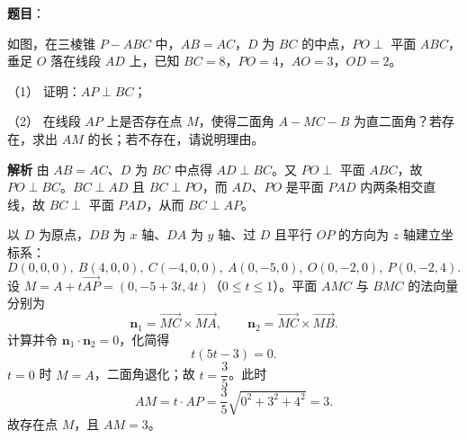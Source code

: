 \begin{answer}

\textbf{题目}：

如图，在三棱锥 $P-ABC$ 中，$AB=AC$，$D$ 为 $BC$ 的中点，$PO\perp$ 平面 $ABC$，垂足 $O$ 落在线段 $AD$ 上，已知 $BC=8$，$PO=4$，$AO=3$，$OD=2$。

（1） 证明：$AP\perp BC$；

（2） 在线段 $AP$ 上是否存在点 $M$，使得二面角 $A-MC-B$ 为直二面角？若存在，求出 $AM$ 的长；若不存在，请说明理由。
\nopagebreak[4]
\begin{center}\end{center}
\nopagebreak[4]
\textbf{解析}
由 $AB=AC$、$D$ 为 $BC$ 中点得 $AD\perp BC$。又 $PO\perp$ 平面 $ABC$，故 $PO\perp BC$。$BC\perp AD$ 且 $BC\perp PO$，而 $AD$、$PO$ 是平面 $PAD$ 内两条相交直线，故 $BC\perp$ 平面 $PAD$，从而 $BC\perp AP$。

以 $D$ 为原点，$DB$ 为 $x$ 轴、$DA$ 为 $y$ 轴、过 $D$ 且平行 $OP$ 的方向为 $z$ 轴建立坐标系：
\nopagebreak[4]
\[D(0,0,0),\ B(4,0,0),\ C(-4,0,0),\ A(0,-5,0),\ O(0,-2,0),\ P(0,-2,4).\]
设 $M=A+t\overrightarrow{AP}=(0,-5+3t,4t)$（$0\leqslant t\leqslant1$）。平面 $AMC$ 与 $BMC$ 的法向量分别为
\nopagebreak[4]
\[\boldsymbol n_1=\overrightarrow{MC}\times\overrightarrow{MA},\qquad \boldsymbol n_2=\overrightarrow{MC}\times\overrightarrow{MB}.\]
计算并令 $\boldsymbol n_1\cdot\boldsymbol n_2=0$，化简得
\nopagebreak[4]
\[t(5t-3)=0.\]
$t=0$ 时 $M=A$，二面角退化；故 $t=\dfrac35$。此时
\nopagebreak[4]
\[AM=t\cdot AP=\frac35\sqrt{0^2+3^2+4^2}=3.\]
故存在点 $M$，且 $AM=3$。



\end{answer}
